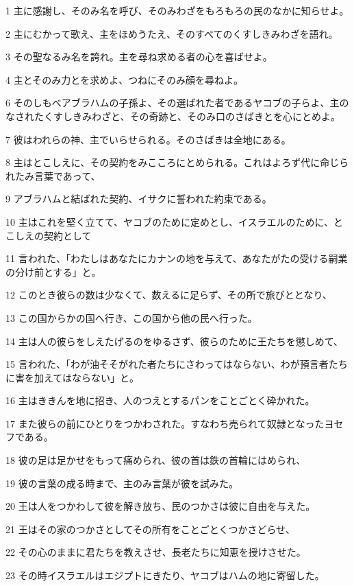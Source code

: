 \par 1 主に感謝し、そのみ名を呼び、そのみわざをもろもろの民のなかに知らせよ。
\par 2 主にむかって歌え、主をほめうたえ、そのすべてのくすしきみわざを語れ。
\par 3 その聖なるみ名を誇れ。主を尋ね求める者の心を喜ばせよ。
\par 4 主とそのみ力とを求めよ、つねにそのみ顔を尋ねよ。
\par 6 そのしもべアブラハムの子孫よ、その選ばれた者であるヤコブの子らよ、主のなされたくすしきみわざと、その奇跡と、そのみ口のさばきとを心にとめよ。
\par 7 彼はわれらの神、主でいらせられる。そのさばきは全地にある。
\par 8 主はとこしえに、その契約をみこころにとめられる。これはよろず代に命じられたみ言葉であって、
\par 9 アブラハムと結ばれた契約、イサクに誓われた約束である。
\par 10 主はこれを堅く立てて、ヤコブのために定めとし、イスラエルのために、とこしえの契約として
\par 11 言われた、「わたしはあなたにカナンの地を与えて、あなたがたの受ける嗣業の分け前とする」と。
\par 12 このとき彼らの数は少なくて、数えるに足らず、その所で旅びととなり、
\par 13 この国からかの国へ行き、この国から他の民へ行った。
\par 14 主は人の彼らをしえたげるのをゆるさず、彼らのために王たちを懲しめて、
\par 15 言われた、「わが油そそがれた者たちにさわってはならない、わが預言者たちに害を加えてはならない」と。
\par 16 主はききんを地に招き、人のつえとするパンをことごとく砕かれた。
\par 17 また彼らの前にひとりをつかわされた。すなわち売られて奴隷となったヨセフである。
\par 18 彼の足は足かせをもって痛められ、彼の首は鉄の首輪にはめられ、
\par 19 彼の言葉の成る時まで、主のみ言葉が彼を試みた。
\par 20 王は人をつかわして彼を解き放ち、民のつかさは彼に自由を与えた。
\par 21 王はその家のつかさとしてその所有をことごとくつかさどらせ、
\par 22 その心のままに君たちを教えさせ、長老たちに知恵を授けさせた。
\par 23 その時イスラエルはエジプトにきたり、ヤコブはハムの地に寄留した。
